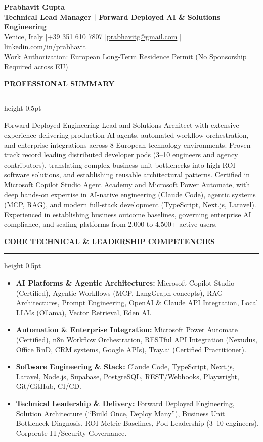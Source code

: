\documentclass[10pt, a4paper]{article}
\newcommand{\cvsection}[1]{%
  \vspace{6pt}%
  {\normalsize\bfseries\MakeUppercase{#1}}%
  \vspace{2pt}%
  \hrule height 0.5pt%
  \vspace{4pt}%
}
\begin{document}
\newpage

\begin{center}
  {\LARGE\textbf{Prabhavit Gupta}}\\[3pt]
  \textbf{Technical Lead Manager | Forward Deployed AI \& Solutions Engineering}\\[3pt]
  Venice, Italy \quad$|$\quad +39 351 610 7807 \quad$|$\quad \href{mailto:prabhavitg@gmail.com}{prabhavitg@gmail.com} \quad$|$\quad \href{https://www.linkedin.com/in/prabhavit/}{linkedin.com/in/prabhavit}\\[2pt]
  {\small Work Authorization: European Long-Term Residence Permit (No Sponsorship Required across EU)}
\end{center}
\vspace{-2pt}

\cvsection{Professional Summary}
Forward-Deployed Engineering Lead and Solutions Architect with extensive experience delivering production AI agents, automated workflow orchestration, and enterprise integrations across 8 European technology environments. Proven track record leading distributed developer pods (3--10 engineers and agency contributors), translating complex business unit bottlenecks into high-ROI software solutions, and establishing reusable architectural patterns. Certified in Microsoft Copilot Studio Agent Academy and Microsoft Power Automate, with deep hands-on expertise in AI-native engineering (Claude Code), agentic systems (MCP, RAG), and modern full-stack development (TypeScript, Next.js, Laravel). Experienced in establishing business outcome baselines, governing enterprise AI compliance, and scaling platforms from 2,000 to 4,500+ active users.

\cvsection{Core Technical \& Leadership Competencies}
\begin{itemize}
  \item \textbf{AI Platforms \& Agentic Architectures:} Microsoft Copilot Studio (Certified), Agentic Workflows (MCP, LangGraph concepts), RAG Architectures, Prompt Engineering, OpenAI \& Claude API Integration, Local LLMs (Ollama), Vector Retrieval, Eden AI.
  \item \textbf{Automation \& Enterprise Integration:} Microsoft Power Automate (Certified), n8n Workflow Orchestration, RESTful API Integration (Nexudus, Office RnD, CRM systems, Google APIs), Tray.ai (Certified Practitioner).
  \item \textbf{Software Engineering \& Stack:} Claude Code, TypeScript, Next.js, Laravel, Node.js, Supabase, PostgreSQL, REST/Webhooks, Playwright, Git/GitHub, CI/CD.
  \item \textbf{Technical Leadership \& Delivery:} Forward Deployed Engineering, Solution Architecture (``Build Once, Deploy Many''), Business Unit Bottleneck Diagnosis, ROI Metric Baselines, Pod Leadership (3--10 engineers), Corporate IT/Security Governance.
\end{itemize}
\end{document}
